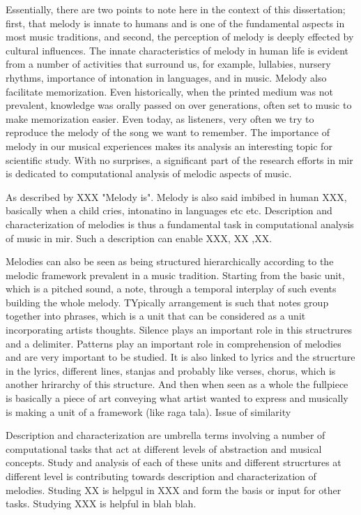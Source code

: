 Essentially, there are two points to note here in the context of this dissertation; first, that melody is innate to humans and is one of the fundamental aspects in most music traditions, and second, the perception of melody is deeply effected by cultural influences. The innate characteristics of melody in human life is evident from a number of activities that surround us,  for example, lullabies, nursery rhythms, importance of intonation in languages, and in music. Melody also facilitate memorization. Even historically, when the printed medium was not prevalent, knowledge was orally passed on over generations, often set to music to make memorization easier. Even today, as listeners, very often we try to reproduce the melody of the song we want to remember. The importance of melody in our musical experiences makes its analysis an interesting topic for scientific study. With no surprises, a significant part of the research efforts in \gls{mir} is dedicated to computational analysis of melodic aspects of music.





As described by XXX "Melody is". Melody is also said imbibed in human XXX, basically when a child cries, intonatino in languages etc etc. Description and characterization of melodies is thus a fundamental task in computational analysis of music in \gls{mir}. Such a description can enable XXX, XX ,XX. 

Melodies can also be seen as being structured hierarchically according to the melodic framework prevalent in a music tradition. Starting from the basic unit, which is a pitched sound, a note, through a temporal interplay of such events building the whole melody. TYpically arrangement is such that notes group together into phrases, which is a unit that can be considered as a unit incorporating artists thoughts. Silence plays an important role in this structrures and a delimiter. Patterns play an important role in comprehension of melodies and are very important to be studied. It is also linked to lyrics and the strucrture in the lyrics, different lines, stanjas and probably like verses, chorus, which is another hrirarchy of this structure. And then when seen as a whole the fullpiece is basically a piece of art conveying what artist wanted to express and musically is making a unit of a framework (like raga tala). Issue of similarity

Description and characterization are umbrella terms involving a number of computational tasks that act at different levels of abstraction and musical concepts.  Study and analysis of each of these units and different strucrtures at different level is contributing towards description and characterization of melodies. Studing XX is helpgul in XXX and form the basis or input for other tasks. Studying XXX is helpful in blah blah.




